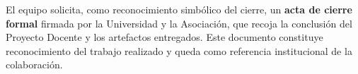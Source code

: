 El equipo solicita, como reconocimiento simb\'olico del cierre, un
\textbf{acta de cierre formal} firmada por la Universidad y la
Asociaci\'on, que recoja la conclusi\'on del Proyecto Docente y los
artefactos entregados. Este documento constituye reconocimiento del
trabajo realizado y queda como referencia institucional de la
colaboraci\'on.
